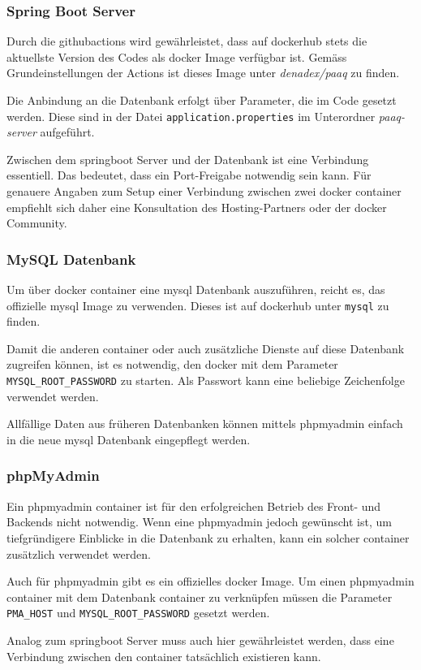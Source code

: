 \documentclass[../main.tex]{subfiles}
\begin{document}
	\subsubsection{Spring Boot Server}
	\par Durch die \gls{githubactions} wird gewährleistet, dass auf \gls{dockerhub} stets die aktuellste Version des Codes als \gls{docker} Image verfügbar ist. Gemäss Grundeinstellungen der Actions ist dieses Image unter \textit{denadex/paaq} zu finden. 
	\par Die Anbindung an die Datenbank erfolgt über Parameter, die im Code gesetzt werden. Diese sind in der Datei \texttt{application.properties} im Unterordner \textit{paaq-server} aufgeführt.
	\par Zwischen dem \gls{springboot} Server und der Datenbank ist eine Verbindung essentiell. Das bedeutet, dass ein Port-Freigabe notwendig sein kann. Für genauere Angaben zum Setup einer Verbindung zwischen zwei \gls{docker} \gls{container} empfiehlt sich daher eine Konsultation des Hosting-Partners oder der \gls{docker} Community.
	
	\subsubsection{MySQL Datenbank}
	\par Um über \gls{docker} \gls{container}  eine \gls{mysql} Datenbank auszuführen, reicht es, das offizielle \gls{mysql} Image zu verwenden. Dieses ist auf \gls{dockerhub} unter \texttt{mysql} zu finden.
	\par Damit die anderen \gls{container} oder auch zusätzliche Dienste auf diese Datenbank zugreifen können, ist es notwendig, den \gls{docker} mit dem Parameter \texttt{MYSQL\_ROOT\_PASSWORD} zu starten. Als Passwort kann eine beliebige Zeichenfolge verwendet werden.
	\par Allfällige Daten aus früheren Datenbanken können mittels \gls{phpmyadmin} einfach in die neue \gls{mysql} Datenbank eingepflegt werden.
	
	\subsubsection{phpMyAdmin}
	\par Ein \gls{phpmyadmin} \gls{container} ist für den erfolgreichen Betrieb des Front- und Backends nicht notwendig. Wenn eine \gls{phpmyadmin} jedoch gewünscht ist, um tiefgründigere Einblicke in die Datenbank zu erhalten, kann ein solcher \gls{container} zusätzlich verwendet werden.
	\par Auch für \gls{phpmyadmin} gibt es ein offizielles \gls{docker} Image. Um einen \gls{phpmyadmin} \gls{container} mit dem Datenbank \gls{container} zu verknüpfen müssen die Parameter \texttt{PMA\_HOST} und \texttt{MYSQL\_ROOT\_PASSWORD} gesetzt werden.
	\par Analog zum \gls{springboot} Server muss auch hier gewährleistet werden, dass eine Verbindung zwischen den \gls{container} tatsächlich existieren kann.
	
\end{document}
